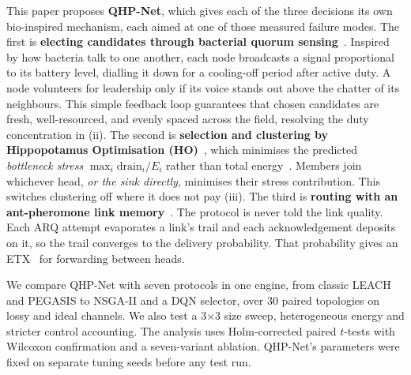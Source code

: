 \documentclass[conference]{IEEEtran}
\begin{document}
This paper proposes \textbf{QHP-Net}, which gives each of the three decisions its own bio-inspired mechanism, each aimed at one of those measured failure modes. The first is \textbf{electing candidates through bacterial quorum sensing}~\cite{miller2001quorum}. Inspired by how bacteria talk to one another, each node broadcasts a signal proportional to its battery level, dialling it down for a cooling-off period after active duty. A node volunteers for leadership only if its voice stands out above the chatter of its neighbours. This simple feedback loop guarantees that chosen candidates are fresh, well-resourced, and evenly spaced across the field, resolving the duty concentration in (ii). The second is \textbf{selection and clustering by Hippopotamus Optimisation (HO)}~\cite{amiri2024hippo}, which minimises the predicted \emph{bottleneck stress} $\max_i \text{drain}_i/E_i$ rather than total energy~\cite{chang2004maxlife}. Members join whichever head, \emph{or the sink directly}, minimises their stress contribution. This switches clustering off where it does not pay (iii). The third is \textbf{routing with an ant-pheromone link memory}~\cite{dorigo2006aco}. The protocol is never told the link quality. Each ARQ attempt evaporates a link's trail and each acknowledgement deposits on it, so the trail converges to the delivery probability. That probability gives an ETX~\cite{decouto2003etx} for forwarding between heads.

We compare QHP-Net with seven protocols in one engine, from classic LEACH and PEGASIS to NSGA-II and a DQN selector, over 30 paired topologies on lossy and ideal channels. We also test a 3$\times$3 size sweep, heterogeneous energy and stricter control accounting. The analysis uses Holm-corrected paired $t$-tests with Wilcoxon confirmation and a seven-variant ablation. QHP-Net's parameters were fixed on separate tuning seeds before any test run.

\end{document}
